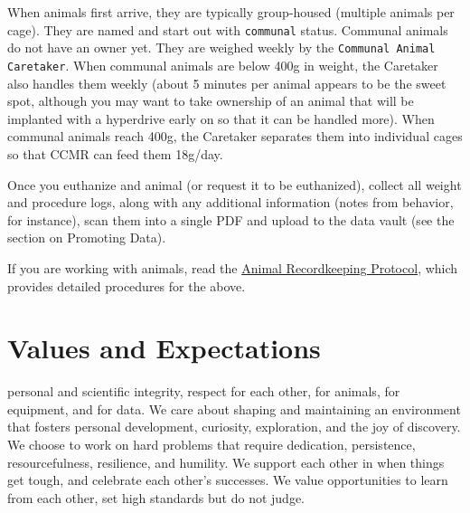 \documentclass{tufte-book}
\newcommand{\doccls}[1]{\texttt{#1}}%
\begin{document}
When animals first arrive, they are typically group-housed (multiple
animals per cage). They are named and start out with \doccls{communal}
status. Communal animals do not have an owner yet. They are weighed
weekly by the \doccls{Communal Animal Caretaker}. When communal animals are below 400g
in weight, the Caretaker also handles them weekly (about 5 minutes per
animal appears to be the sweet spot, although you may want to take
ownership of an animal that will be implanted with a hyperdrive early
on so that it can be handled more). When communal animals reach 400g,
the Caretaker separates them into individual cages so that CCMR can
feed them 18g/day.

Once you euthanize and animal (or request it to be euthanized),
collect all weight and procedure logs, along with any additional
information (notes from behavior, for instance), scan them into a
single PDF and
upload to the data vault (see the section on Promoting Data).

If you are working with animals, read the \href{github link}{Animal
  Recordkeeping Protocol}, which provides detailed procedures for the
above.


\chapter{Values and Expectations}\label{ch:expectations}

 personal and scientific integrity, respect
for each other, for animals, for equipment, and for data. We care
about shaping and maintaining an environment that fosters personal
development, curiosity, exploration, and the joy of discovery. We
choose to work on hard problems that require dedication, persistence,
resourcefulness, resilience, and humility. We support each other in
when things get tough, and celebrate each other's successes. We value
opportunities to learn from each other, set high standards but do not
judge.
\end{document}
